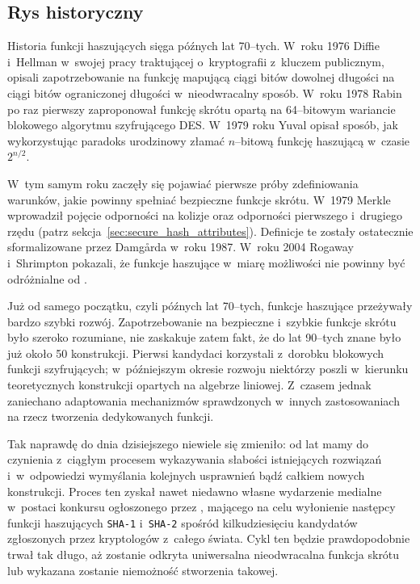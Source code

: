 \documentclass[12pt,a4paper,twoside]{article}
\begin{document}
\subsection{Rys historyczny}
Historia funkcji haszujących sięga późnych lat 70--tych. W~roku 1976 Diffie
i~Hellman w~swojej pracy traktującej o~kryptografii z~kluczem publicznym,
opisali zapotrzebowanie na funkcję mapującą ciągi bitów dowolnej długości na
ciągi bitów ograniczonej długości w~nieodwracalny sposób. W~roku 1978 Rabin po
raz pierwszy zaproponował funkcję skrótu opartą na 64--bitowym wariancie
blokowego algorytmu szyfrującego DES. W~1979 roku Yuval opisał sposób, jak
wykorzystując paradoks urodzinowy złamać $n$--bitową funkcję haszującą w~czasie
$2^{n/2}$.

W~tym samym roku zaczęły się pojawiać pierwsze próby zdefiniowania warunków,
jakie powinny spełniać bezpieczne funkcje skrótu. W~1979 Merkle wprowadził
pojęcie odporności na kolizje oraz odporności pierwszego i~drugiego rzędu
(patrz sekcja~\ref{sec:secure_hash_attributes}). Definicje te zostały
ostatecznie sformalizowane przez Damg\r{a}rda w~roku 1987. W~roku 2004 Rogaway
i~Shrimpton pokazali, że funkcje haszujące w~miarę możliwości nie powinny być
odróżnialne od .

Już od samego początku, czyli późnych lat 70--tych, funkcje haszujące
przeżywały bardzo szybki rozwój. Zapotrzebowanie na bezpieczne i~szybkie
funkcje skrótu było szeroko rozumiane, nie zaskakuje zatem fakt, że do lat
90--tych znane było już około 50 konstrukcji. Pierwsi kandydaci korzystali
z~dorobku blokowych funkcji szyfrujących; w~późniejszym okresie rozwoju
niektórzy poszli w~kierunku teoretycznych konstrukcji opartych na algebrze
liniowej. Z~czasem jednak zaniechano adaptowania mechanizmów sprawdzonych
w~innych zastosowaniach na rzecz tworzenia dedykowanych funkcji.

Tak naprawdę do dnia dzisiejszego niewiele się zmieniło: od lat mamy do
czynienia z~ciągłym procesem wykazywania słabości istniejących rozwiązań
i~w~odpowiedzi wymyślania kolejnych usprawnień bądź całkiem nowych konstrukcji.
Proces ten zyskał nawet niedawno własne wydarzenie medialne w~postaci konkursu
ogłoszonego przez , mającego
na celu wyłonienie następcy funkcji haszujących \texttt{SHA-1} i~\texttt{SHA-2}
spośród kilkudziesięciu kandydatów zgłoszonych przez kryptologów z~całego
świata. Cykl ten będzie prawdopodobnie trwał tak długo, aż zostanie odkryta
uniwersalna nieodwracalna funkcja skrótu lub wykazana zostanie niemożność
stworzenia takowej.
\end{document}
